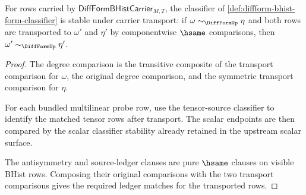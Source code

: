 \begin{theorem}
\label{thm:diffform-form-classifier-stability}
For rows carried by $\mathsf{DiffFormBHistCarrier}_{M,T}$, the classifier of
\autoref{def:diffform-bhist-form-classifier} is stable under carrier
transport: if $\omega\sim_{\DiffFormUp}\eta$ and both rows are transported to
$\omega'$ and $\eta'$ by componentwise $\hsame$ comparisons, then
$\omega'\sim_{\DiffFormUp}\eta'$.
\end{theorem}
\begin{proof}
The degree comparison is the transitive composite of the transport comparison
for $\omega$, the original degree comparison, and the symmetric transport
comparison for $\eta$.

For each bundled multilinear probe row, use the tensor-source classifier to
identify the matched tensor rows after transport. The scalar endpoints are
then compared by the scalar classifier stability already retained in the
upstream scalar surface.

The antisymmetry and source-ledger clauses are pure $\hsame$ clauses on
visible BHist rows. Composing their original comparisons with the two
transport comparisons gives the required ledger matches for the transported
rows.
\end{proof}


